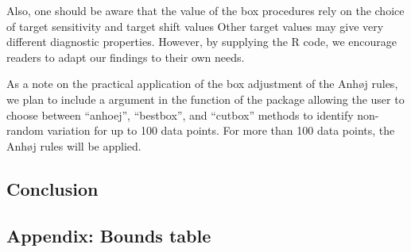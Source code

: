Also, one should be aware that the value of the box procedures rely on
the choice of target sensitivity and target shift values Other target
values may give very different diagnostic properties. However, by
supplying the R code, we encourage readers to adapt our findings to
their own needs.

As a note on the practical application of the box adjustment of the
Anhøj rules, we plan to include a  argument in the
 function of the  package allowing the
user to choose between ``anhoej'', ``bestbox'', and ``cutbox'' methods
to identify non-random variation for up to 100 data points. For more
than 100 data points, the Anhøj rules will be applied.

\hypertarget{conclusion}{%
\subsection{Conclusion}\label{conclusion}}



\hypertarget{appendix-bounds-table}{%
\subsection{Appendix: Bounds table}\label{appendix-bounds-table}}

